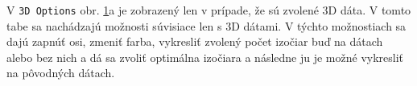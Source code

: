 \documentclass[a4paper,12pt,twoside]{article}%
\begin{document}
V \texttt{3D Options} obr. \ref{fig:uidata2}a je zobrazený len v prípade, že sú zvolené 3D dáta. V tomto tabe sa nachádzajú možnosti súvisiace len s 3D dátami. V týchto možnostiach sa dajú zapnúť osi, zmeniť farba, vykresliť zvolený počet izočiar buď na dátach alebo bez nich a dá sa zvoliť optimálna izočiara a následne ju je možné vykresliť na pôvodných dátach. 

\begin{figure}[H]%
    \centering
    \qquad
    \caption{}%
    \label{fig:uidata2}%
\end{figure}
\end{document}
